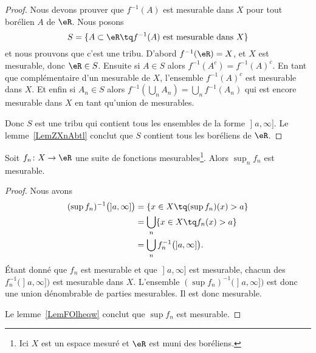\begin{proof}
    Nous devons prouver que \( f^{-1}(A)\) est mesurable dans \( X\) pour tout borélien \( A\) de \( \eR\). Nous posons
    \begin{equation}
        S=\{ A\subset \eR\tq f^{-1}(A)\text{ est mesurable dans } X \}
    \end{equation}
    et nous prouvons que c'est une tribu. D'abord \( f^{-1}(\eR)=X\), et \( X\) est mesurable, donc \( \eR\in S\). Ensuite si \( A\in S\) alors \( f^{-1}(A^c)=f^{-1}(A)^c\). En tant que complémentaire d'un mesurable de \( X\), l'ensemble \( f^{-1}(A)^c\) est mesurable dans \( X\). Et enfin si \( A_n\in S \) alors \( f^{-1}(\bigcup_nA_n)=\bigcup_nf^{-1}(A_n)\) qui est encore mesurable dans \( X\) en tant qu'union de mesurables.

    Donc \( S\) est une tribu qui contient tous les ensembles de la forme \( \mathopen] a , \infty \mathclose]\). Le lemme~\ref{LemZXnAbtl} conclut que \( S\) contient tous les boréliens de \( \eR\).
\end{proof}

\begin{lemma}   \label{LemIGKvbNR}
    Soit \( f_n\colon X\to \eR\) une suite de fonctions mesurables\footnote{Ici \( X\) est un espace mesuré et \( \eR\) est muni des boréliens.}. Alors \( \sup_n f_n\) est mesurable.
\end{lemma}

\begin{proof}
    Nous avons
    \begin{subequations}
        \begin{align}
            (\sup f_n)^{-1}\big( \mathopen] a , \infty \mathclose] \big)  & =\{ x\in X \tq (\sup f_n)(x)>a \} \\
                & =\bigcup_n\{ x\in X\tq f_n(x)>a \}                            \\
                & =\bigcup_nf_n^{-1}\big( \mathopen] a , \infty \mathclose] \big).
        \end{align}
    \end{subequations}
    Étant donné que \( f_n\) est mesurable et que \( \mathopen] a , \infty \mathclose]\) est mesurable, chacun des \( f_n^{-1}\big( \mathopen] a , \infty \mathclose] \big) \) est mesurable dans \( X\). L'ensemble \( (\sup f_n)^{-1}\big( \mathopen] a , \infty \mathclose] \big)\) est donc une union dénombrable de parties mesurables. Il est donc mesurable.

    Le lemme~\ref{LemFOlheqw} conclut que \( \sup f_n\) est mesurable.
\end{proof}

